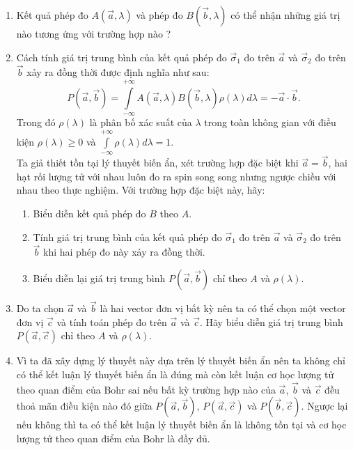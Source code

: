 \begin{enumerate}
\begin{enumerate}[label=\textbf{\alph*,}]\itemsep0em
    \item Kết quả phép đo $A(\Vec{a},\lambda)$ và phép đo $B(\Vec{b},\lambda)$ có thể nhận những giá trị nào tương ứng với trường hợp nào ?\\
    \item Cách tính giá trị trung bình của kết quả phép đo $\Vec{\sigma}_1$ đo trên $\Vec{a}$ và $\Vec{\sigma}_2$ đo trên $\Vec{b}$ xảy ra đồng thời được định nghĩa như sau:
$$P(\Vec{a},\Vec{b})=\displaystyle\int\limits_{-\infty}^{+\infty}A(\Vec{a},\lambda)B(\Vec{b},\lambda)\rho(\lambda)d\lambda=-\Vec{a}\cdot \Vec{b}.$$
Trong đó $\rho(\lambda)$ là phân bố xác suất của $\lambda$ trong toàn không gian với điều kiện $\rho(\lambda) \geq 0$ và $\displaystyle\int\limits_{-\infty}^{+\infty}\rho(\lambda)d\lambda=1$. \\
Ta giả thiết tồn tại lý thuyết biến ẩn, xét trường hợp đặc biệt khi $\Vec{a} = \Vec{b}$, hai hạt rối lượng tử với nhau luôn đo ra spin song song nhưng ngược chiều với nhau theo thực nghiệm. Với trường hợp đặc biệt này, hãy:
        \begin{enumerate}
            \item Biểu diễn kết quả phép đo $B$ theo $A$.
            \item Tính giá trị trung bình của kết quả phép đo $\Vec{\sigma}_1$ đo trên $\Vec{a}$ và $\Vec{\sigma}_2$ đo trên $\Vec{b}$ khi hai phép đo này xảy ra đồng thời.
            \item Biểu diễn lại giá trị trung bình $P(\Vec{a},\Vec{b})$ chỉ theo $A$ và $\rho(\lambda)$.
        \end{enumerate}
      \item Do ta chọn $\Vec{a}$ và $\Vec{b}$ là hai vector đơn vị bất kỳ nên ta có thể chọn một vector đơn vị $\Vec{c}$ và tính toán phép đo trên $\Vec{a}$ và $\Vec{c}$. Hãy biểu diễn giá trị trung bình $P(\Vec{a},\Vec{c})$ chỉ theo $A$ và $\rho(\lambda)$.
      \item Vì ta đã xây dựng lý thuyết này dựa trên lý thuyết biến ẩn nên ta không chỉ có thể kết luận lý thuyết biến ẩn là đúng mà còn kết luận cơ học lượng tử theo quan điểm của Bohr sai nếu bất kỳ trường hợp nào của $\Vec{a}$, $\Vec{b}$ và $\Vec{c}$ đều thoả mãn điều kiện nào đó giữa $P(\Vec{a},\Vec{b})$, $P(\Vec{a},\Vec{c})$ và $P(\Vec{b},\Vec{c})$. Ngược lại nếu không thì ta có thể kết luận lý thuyết biến ẩn là không tồn tại và cơ học lượng tử theo quan điểm của Bohr là đầy đủ.
      \begin{enumerate}

\end{enumerate}
\end{enumerate}
\end{enumerate}
